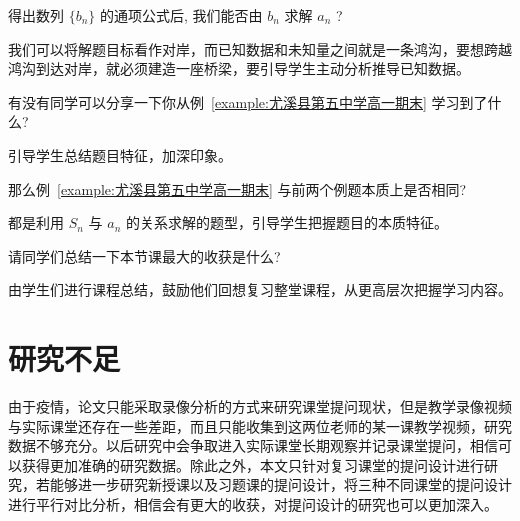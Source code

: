 \begin{question}
  得出数列 $\{b_{n}\}$ 的通项公式后, 我们能否由 $b_{n}$ 求解 $a_{n}$ ?
\end{question}

\begin{designgoal}
  我们可以将解题目标看作对岸，而已知数据和未知量之间就是一条鸿沟，要想跨越鸿沟到达对岸，就必须建造一座桥梁，要引导学生主动分析推导已知数据。
\end{designgoal}

\begin{question}
  有没有同学可以分享一下你从例~\ref{example:尤溪县第五中学高一期末} 学习到了什么?
\end{question}

\begin{designgoal}
  引导学生总结题目特征，加深印象。
\end{designgoal}

\begin{question}
  那么例~\ref{example:尤溪县第五中学高一期末} 与前两个例题本质上是否相同?
\end{question}

\begin{designgoal}
  都是利用 $S_n$ 与 $a_n$ 的关系求解的题型，引导学生把握题目的本质特征。
\end{designgoal}

\begin{question}
  请同学们总结一下本节课最大的收获是什么?
\end{question}

\begin{designgoal}
  由学生们进行课程总结，鼓励他们回想复习整堂课程，从更高层次把握学习内容。
\end{designgoal}



\section{研究不足}

由于疫情，论文只能采取录像分析的方式来研究课堂提问现状，但是教学录像视频与实际课堂还存在一些差距，而且只能收集到这两位老师的某一课教学视频，研究数据不够充分。以后研究中会争取进入实际课堂长期观察并记录课堂提问，相信可以获得更加准确的研究数据。除此之外，本文只针对复习课堂的提问设计进行研究，若能够进一步研究新授课以及习题课的提问设计，将三种不同课堂的提问设计进行平行对比分析，相信会有更大的收获，对提问设计的研究也可以更加深入。